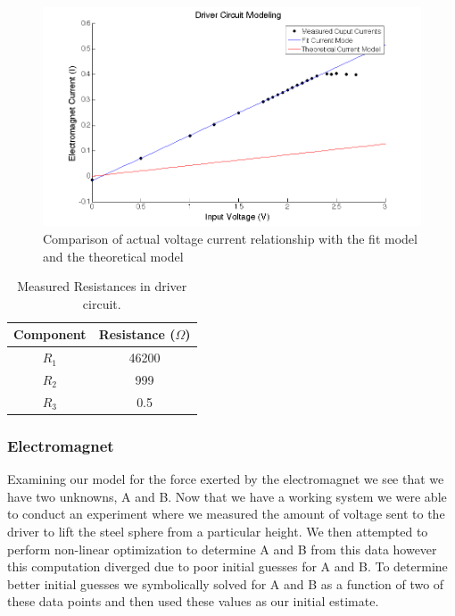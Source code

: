 \documentclass{article}
\theoremstyle{plain}
\theoremstyle{definition}
\theoremstyle{remark}
\begin{document}
\begin{figure}
\begin{center}
\includegraphics[width = 13cm]{DriverCircuitModel.png}
\end{center}
\label{Q1_d2}
\caption{Comparison of actual voltage current relationship with the fit model and the theoretical model}
\end{figure}

\begin{table}
\begin{center}
    \begin{tabular}{|c|c|}
        \hline
        Component & Resistance ($\Omega$) \\ \hline
        $R_{1}$   & 46200                 \\ 
        $R_{2}$   & 999                   \\ 
        $R_{3}$   & 0.5                   \\
        \hline
    \end{tabular}
\end{center}
\label{Q1_dt1}
\caption{Measured Resistances in driver circuit.}
\end{table}

\subsubsection*{Electromagnet}
Examining our model for the force exerted by the electromagnet we see that we have two unknowns, A and B.  Now that we have a working system we were able to conduct an experiment where we measured the amount of voltage sent to the driver to lift the steel sphere from a particular height.  We then attempted to perform non-linear optimization to determine A and B from this data however this computation diverged due to poor initial guesses for A and B.  To determine better initial guesses we symbolically solved for A and B as a function of two of these data points and then used these values as our initial estimate.  
\end{document}
